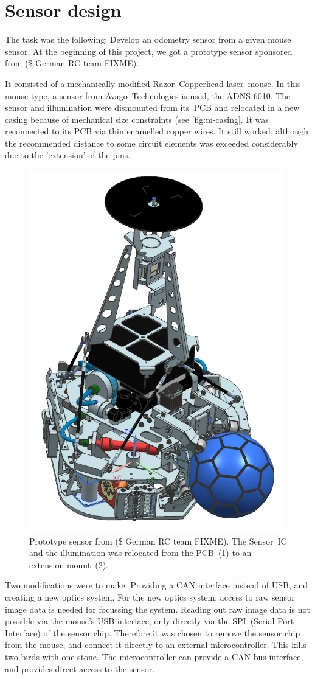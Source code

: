 \documentclass[12pt,a4paper]{article}
\begin{document}

\clearpage
\section{Sensor design}

The task was the following: Develop an odometry sensor from a given mouse sensor.
At the beginning of this project, we got a prototype sensor sponsored from (\$ German RC team FIXME).

It consisted of a mechanically modified Razor~Copperhead laser~mouse.
In this mouse type, a sensor from Avago~Technologies is used, the ADNS-6010.
The sensor and illumination were dismounted from its~PCB and relocated in a new casing because of mechanical size constraints (see \autoref{fig:m-casing}.
It was reconnected to its PCB via thin enamelled copper wires.
It still worked, although the recommended distance to some circuit elements was exceeded considerably due to the 'extension' of the pins.

\begin{figure}[hb]
\begin{center}  
\includegraphics[width=0.5\columnwidth]{figures/Krikkit3G.jpg}
\caption{\label{fig:m-casing}
Prototype sensor from (\$ German RC team FIXME).
The Sensor~IC and the illumination was relocated from the PCB~(1) to an extension mount~(2).
}   
\end{center}
\end{figure}

Two modifications were to make: Providing a CAN interface instead of USB, and creating a new optics system.
For the new optics system, access to raw sensor image data is needed for focussing the system.
Reading out raw image data is not possible via the mouse's USB interface, only directly via the SPI~(Serial Port Interface) of the sensor chip.
Therefore it was chosen to remove the sensor chip from the mouse, and connect it directly to an external microcontroller.
This kills two birds with one stone.
The microcontroller can provide a CAN-bus interface, and provides direct access to the sensor.
\end{document}
